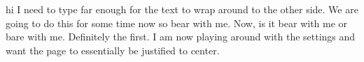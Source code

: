 \documentclass{article}
\newcommand{\problem}[1]{\vspace{.5cm}{\Large  \textbf{#1} \\}}
\begin{document}
 



hi I need to type far enough for the text to wrap around to the other side.  We are going to do this for some time now so bear with me.  Now, is it bear with me or bare with me.  Definitely the first.  I am now playing around with the settings and want the page to essentially be justified to center.



\end{document}

